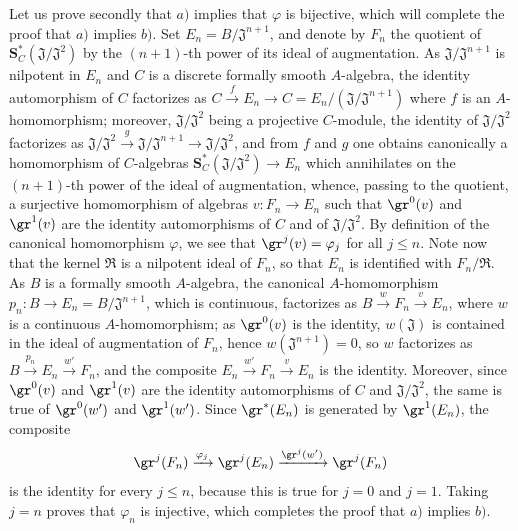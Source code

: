 \begin{env}[19.5.4.2]
\label{0.19.5.4.2}
Let us prove secondly that $a)$ implies that $\varphi$ is bijective, which will complete the proof that $a)$ implies $b)$.
Set $E_n=B/\mathfrak{J}^{n+1}$, and denote by $F_n$ the quotient of $\mathbf{S}_C^*(\mathfrak{J}/\mathfrak{J}^2)$ by the $(n+1)$-th power of its ideal of augmentation.
As $\mathfrak{J}/\mathfrak{J}^{n+1}$ is nilpotent in $E_n$ and $C$ is a discrete formally smooth $A$-algebra, the identity automorphism of $C$ factorizes as $C\xrightarrow{f}E_n\to C=E_n/(\mathfrak{J}/\mathfrak{J}^{n+1})$ where $f$ is an $A$-homomorphism;
 moreover, $\mathfrak{J}/\mathfrak{J}^2$ being a projective $C$-module, the identity of $\mathfrak{J}/\mathfrak{J}^2$ factorizes as $\mathfrak{J}/\mathfrak{J}^2\xrightarrow{g}\mathfrak{J}/\mathfrak{J}^{n+1}\to\mathfrak{J}/\mathfrak{J}^2$, and from $f$ and $g$ one obtains canonically a homomorphism of $C$-algebras $\mathbf{S}_C^*(\mathfrak{J}/\mathfrak{J}^2)\to E_n$ which annihilates on the $(n+1)$-th power of the ideal of augmentation, whence, passing to the quotient, a surjective homomorphism of algebras $v:F_n\to E_n$ such that $\gr^0(v)$ and $\gr^1(v)$ are the identity automorphisms of $C$ and of $\mathfrak{J}/\mathfrak{J}^2$.
By definition of the canonical homomorphism $\varphi$, we see that $\gr^j(v)=\varphi_j$ for all $j\leq n$.
Note now that the kernel $\mathfrak{R}$ is a nilpotent ideal of $F_n$, so that $E_n$ is identified with $F_n/\mathfrak{R}$.
As $B$ is a formally smooth $A$-algebra, the canonical $A$-homomorphism $p_n:B\to E_n=B/\mathfrak{J}^{n+1}$, which is continuous, factorizes as $B\xrightarrow{w}F_n\xrightarrow{v}E_n$, where $w$ is a continuous $A$-homomorphism;
as $\gr^0(v)$ is the identity, $w(\mathfrak{J})$ is contained in the ideal of augmentation of $F_n$, hence $w(\mathfrak{J}^{n+1})=0$,
so $w$ factorizes as $B\xrightarrow{p_n}E_n\xrightarrow{w'}F_n$, and the composite $E_n\xrightarrow{w'}F_n\xrightarrow{v}E_n$ is the identity.
Moreover, since $\gr^0(v)$ and $\gr^1(v)$ are the identity automorphisms of $C$ and $\mathfrak{J}/\mathfrak{J}^2$, the same is true of $\gr^0(w')$ and $\gr^1(w')$.
Since $\gr^*(E_n)$ is generated by $\gr^1(E_n)$, the composite
\[
  \gr^j(F_n)\xrightarrow{\varphi_j}\gr^j(E_n)
  \xrightarrow{\gr^j(w')}\gr^j(F_n)
\]
is the identity for every $j\leq n$, because this is true for $j=0$ and $j=1$.
Taking $j=n$ proves that $\varphi_n$ is injective, which completes the proof that $a)$ implies $b)$.
\end{env}

